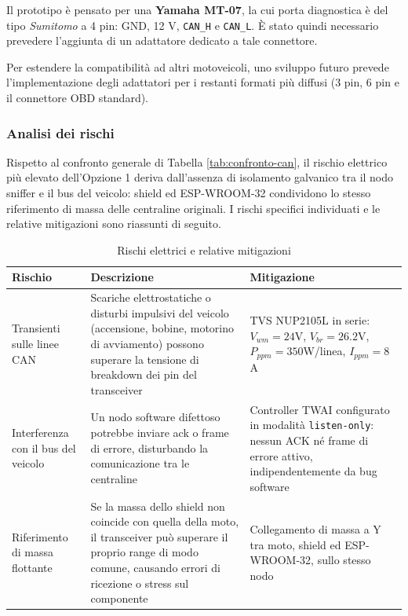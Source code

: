 Il prototipo è pensato per una \textbf{Yamaha MT-07}, la cui porta diagnostica è del tipo \textit{Sumitomo} a 4 pin: GND, 12 V, \texttt{CAN\_H} e \texttt{CAN\_L}.
È stato quindi necessario prevedere l'aggiunta di un adattatore dedicato a tale connettore. 

Per estendere la compatibilità ad altri motoveicoli, uno sviluppo futuro prevede l'implementazione degli 
adattatori per i restanti formati più diffusi (3 pin, 6 pin e il connettore OBD standard).

\subsubsection{Analisi dei rischi}

Rispetto al confronto generale di Tabella \ref{tab:confronto-can}, il rischio elettrico più elevato dell'Opzione 1 deriva dall'assenza di
isolamento galvanico tra il nodo sniffer e il bus del veicolo: shield ed ESP-WROOM-32 condividono lo stesso riferimento di massa delle centraline
originali. I rischi specifici individuati e le relative mitigazioni sono riassunti di seguito. 

\begin{table}[H]
    \centering
    \begin{tabular}{p{4cm} p{6cm} p{4cm}}
        \hline
        \textbf{Rischio} & \textbf{Descrizione} & \textbf{Mitigazione} \\
        \hline
        Transienti sulle linee CAN & Scariche elettrostatiche o disturbi impulsivi del veicolo (accensione, bobine, motorino di
        avviamento) possono superare la tensione di breakdown dei pin del transceiver & TVS NUP2105L in serie: $V_{wm}=24$V,
        $V_{br}=26.2$V, $P_{ppm}=350$W/linea, $I_{ppm}=8$A \\
        \hline
        Interferenza con il bus del veicolo & Un nodo software difettoso potrebbe inviare \gls{ack} o frame di errore, disturbando la
        comunicazione tra le centraline & Controller TWAI configurato in modalità \texttt{listen-only}: nessun ACK né frame di
        errore attivo, indipendentemente da bug software \\
        \hline
        Riferimento di massa flottante & Se la massa dello shield non coincide con quella della moto, il transceiver può superare il
        proprio range di modo comune, causando errori di ricezione o stress sul componente & Collegamento di massa a Y tra moto,
        shield ed ESP-WROOM-32, sullo stesso nodo \\
        \hline
    \end{tabular}
    \caption{Rischi elettrici e relative mitigazioni}
    \label{tab:rischi-mitigazioni}
\end{table}

